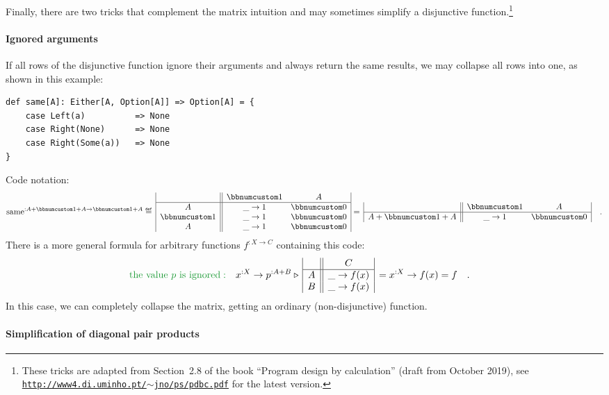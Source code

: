 Finally, there are two tricks that complement the matrix intuition
and may sometimes simplify a disjunctive function.\footnote{These tricks are adapted from Section~2.8 of the book \textsf{``}Program
design by calculation\textsf{''} (draft from October 2019), see \texttt{\href{http://www4.di.uminho.pt/~jno/ps/pdbc.pdf}{http://www4.di.uminho.pt/$\sim$jno/ps/pdbc.pdf}}
for the latest version.}

\paragraph{Ignored arguments}

If all rows of the disjunctive function ignore their arguments and
always return the same results, we may collapse all rows into one,
as shown in this example:
\begin{lstlisting}
def same[A]: Either[A, Option[A]] => Option[A] = {
    case Left(a)          => None
    case Right(None)      => None
    case Right(Some(a))   => None
}
\end{lstlisting}
Code notation:
\[
\text{same}^{:A+\bbnum 1+A\rightarrow\bbnum 1+A}\triangleq\,\begin{array}{|c||cc|}
 & \bbnum 1 & A\\
\hline A & \_\rightarrow1 & \bbnum 0\\
\bbnum 1 & \_\rightarrow1 & \bbnum 0\\
A & \_\rightarrow1 & \bbnum 0
\end{array}=\,\begin{array}{|c||cc|}
 & \bbnum 1 & A\\
\hline A+\bbnum 1+A & \_\rightarrow1 & \bbnum 0
\end{array}\quad.
\]
There is a more general formula for arbitrary functions $f^{:X\rightarrow C}$
containing this code:
\begin{align*}
{\color{greenunder}\text{the value }p\text{ is ignored}:}\quad & x^{:X}\rightarrow p^{:A+B}\triangleright\,\begin{array}{|c||c|}
 & C\\
\hline A & \_\rightarrow f(x)\\
B & \_\rightarrow f(x)
\end{array}\,=x^{:X}\rightarrow f(x)=f\quad.
\end{align*}
In this case, we can completely collapse the matrix, getting an ordinary
(non-disjunctive) function.

\paragraph{Simplification of diagonal pair products}

